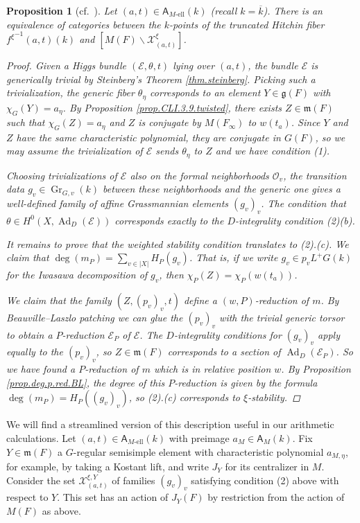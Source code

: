 \documentclass[openany]{amsbook}
\newtheorem{proposition}[theorem]{Proposition}
\theoremstyle{definition}
\theoremstyle{remark}
\numberwithin{equation}{section}
\renewcommand{\O}{\mathcal{O}}
\newcommand{\cE}{\mathcal{E}}
\newcommand{\cX}{\mathcal{X}}
\newcommand{\ol}[1]{\overline{#1}}
\renewcommand{\-}{\operatorname{-}}
\newcommand{\on}[1]{\operatorname{#1}}
\newcommand{\fm}{\mathfrak{m}}
\newcommand{\el}{\text{-ell}}
\newcommand{\bA}{\mathsf{A}}
\newcommand{\bAe}[1]{\bA_{#1\el}}
\renewcommand{\fm}{\mathfrak{m}}
\renewcommand{\fg}{\mathfrak{g}}
\newcommand{\Gr}{\on{Gr}}
\begin{document}
\begin{proposition}[{{cf.\ \cite[\S 7]{CLI}}}]\label{prop.BLdescent.weighted}
    Let $(a,t) \in \bAe{M}(k)$ (recall $k = \ol{k}$). There is an equivalence of categories between the $k$-points of the truncated Hitchin fiber ${f^\xi}^{-1}(a,t)(k)$ and $[M(F) \backslash \cX_{(a,t)}^\xi]$.
    \begin{proof}
    Given a Higgs bundle $(\cE, \theta, t)$ lying over $(a,t)$, the bundle $\cE$ is generically trivial by Steinberg's Theorem \ref{thm.steinberg}. Picking such a trivialization, the generic fiber $\theta_\eta$ corresponds to an element $Y \in \fg(F)$ with $\chi_G(Y) = a_\eta$. By Proposition \ref{prop.CLI.3.9.twisted}, there exists $Z \in \fm(F)$ such that $\chi_G(Z) = a_\eta$ and $Z$ is conjugate by $M(F_\infty)$ to $w(t_a)$. Since $Y$ and $Z$ have the same characteristic polynomial, they are conjugate in $G(F)$, so we may assume the trivialization of $\cE$ sends $\theta_\eta$ to $Z$ and we have condition (1).

    Choosing trivializations of $\cE$ also on the formal neighborhoods $\O_v$, the transition data $g_v \in \Gr_{G,v}(k)$ between these neighborhoods and the generic one gives a well-defined family of affine Grassmannian elements $(g_v)_v$. The condition that $\theta \in H^0(X, \on{Ad}_D(\cE))$ corresponds exactly to the $D$-integrality condition (2)(b). 

    It remains to prove that the weighted stability condition translates to (2).(c). We claim that $\deg(m_P) = \sum_{v \in |X|} H_P(g_v)$. That is, if we write $g_v \in p_v L^+ G(k)$ for the Iwasawa decomposition of $g_v$, then $\chi_P(Z) = \chi_P(w(t_a))$.
    
    We claim that the family $(Z, (p_v)_v, t)$ define a $(w,P)$-reduction of $m$. By Beauville--Laszlo patching we can glue the $(p_v)_v$ with the trivial generic torsor to obtain a $P$-reduction $\cE_P$ of $\cE$. The $D$-integrality conditions for $(g_v)_v$ apply equally to the $(p_v)_v$, so $Z \in \fm(F)$ corresponds to a section of $\on{Ad}_D(\cE_P)$. So we have found a $P$-reduction of $m$ which is in relative position $w$. By Proposition \ref{prop.deg.p.red.BL}, the degree of this $P$-reduction is given by the formula $\deg(m_P) = H_P((g_v)_v)$, so (2).(c) corresponds to $\xi$-stability.
    \end{proof}
\end{proposition}

We will find a streamlined version of this description useful in our arithmetic calculations. Let $(a,t) \in \bAe{M}(k)$ with preimage $a_M \in \bA_M(k)$. Fix $Y \in \fm(F)$ a $G$-regular semisimple element with characteristic polynomial $a_{M,\eta}$, for example, by taking a Kostant lift, and write $J_{Y}$ for its centralizer in $M$. Consider the set $\cX_{(a,t)}^{\xi, Y}$ of families $(g_v)_v$ satisfying condition (2) above with respect to $Y$. This set has an action of $J_Y(F)$ by restriction from the action of $M(F)$ as above.
\end{document}
